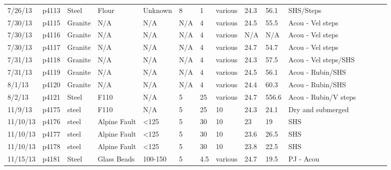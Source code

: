 \begin{landscape}
\begin{longtable} {lllllllllllllll}
7/26/13  & p4113      & Steel            & Flour        & Unknown      & 8         & 1             & various                      & 24.3        & 56.1     & SHS/Steps\\
7/30/13  & p4115      & Granite          & N/A          & N/A          & N/A       & 4             & various                      & 24.5        & 55.5     & Acou - Vel steps\\
7/30/13  & p4116      & Granite          & N/A          & N/A          & N/A       & 4             & various                      & N/A         & N/A      & Acou - Vel steps\\
7/30/13  & p4117      & Granite          & N/A          & N/A          & N/A       & 4             & various                      & 24.7        & 54.7     & Acou - Vel steps\\
7/31/13  & p4118      & Granite          & N/A          & N/A          & N/A       & 4             & various                      & 24.3        & 57.5     & Acou - Vel steps/SHS\\
7/31/13  & p4119      & Granite          & N/A          & N/A          & N/A       & 4             & various                      & 24.5        & 56.1     & Acou - Rubin/SHS\\
8/1/13   & p4120      & Granite          & N/A          & N/A          & N/A       & 4             & various                      & 24.4        & 60.3     & Acou - Rubin/SHS\\
8/2/13   & p4121      & Steel            & F110         & N/A          & 5         & 25            & various                      & 24.7        & 556.6    & Acou - Rubin/V steps\\
11/9/13  & p4175      & steel            & F110         & N/A          & 5         & 25            & 10                           & 24.3        & 24.1     & Dry and submerged\\
11/10/13 & p4176      & steel            & Alpine Fault & \textless125 & 5         & 30            & 10                           & 23          & 19       & SHS\\
11/10/13 & p4177      & steel            & Alpine Fault & \textless125 & 5         & 30            & 10                           & 23.6        & 26.5     & SHS\\
11/10/13 & p4178      & steel            & Alpine Fault & \textless125 & 5         & 30            & 10                           & 23.8        & 22.5     & SHS\\
11/15/13 & p4181      & Steel            & Glass Beads  & 100-150      & 5         & 4.5           & various                      & 24.7        & 19.5     & PJ - Acou\\

\end{longtable}
\end{landscape}

